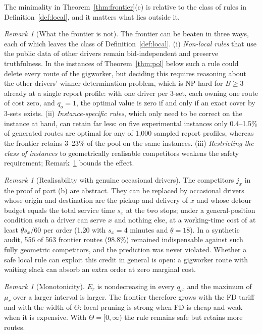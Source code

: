 \documentclass[review,12pt]{elsarticle}
\theoremstyle{definition}
\theoremstyle{remark}
\newtheorem{remark}[theorem]{Remark}
\newcommand{\lth}{\underline{\theta}}
\begin{document}
The minimality in Theorem~\ref{thm:frontier}(c) is relative to the class of
rules in Definition~\ref{def:local}, and it matters what lies outside it.

\begin{remark}[What the frontier is not]
\label{rem:scope}
The frontier can be beaten in three ways, each of which leaves the class of
Definition~\ref{def:local}. (i) \emph{Non-local rules} that use the public
data of other drivers remain bid-independent and preserve truthfulness. In
the instances of Theorem~\ref{thm:pol} below such a rule could delete every
route of the gigworker, but deciding this requires reasoning about the
other drivers' winner-determination problem, which is NP-hard for
$B\ge 3$ already at a single report profile: with one driver per 3-set,
each owning one route of cost zero, and $q_o=1$, the optimal value is zero
if and only if an exact cover by 3-sets exists. (ii) \emph{Instance-specific
rules}, which only need to be correct on the instance at hand, can retain
far less: on five experimental instances only 0.4--1.5\% of generated routes
are optimal for any of 1,000 sampled report profiles, whereas the frontier
retains 3--23\% of the pool on the same instances. (iii) \emph{Restricting
the class of instances} to geometrically realisable competitors weakens the
safety requirement; Remark~\ref{rem:realisable} bounds the effect.
\end{remark}

\begin{remark}[Realisability with genuine occasional drivers]
\label{rem:realisable}
The competitors $j_x$ in the proof of part (b) are abstract. They can be
replaced by occasional drivers whose origin and destination are the pickup
and delivery of $x$ and whose detour budget equals the total service time
$s_x$ at the two stops; under a general-position condition such a driver
can serve $x$ and nothing else, at a working-time cost of at least
$\lth s_x/60$ per order (1.20 with $s_x=4$ minutes and $\lth=18$). In a
synthetic audit, 556 of 563 frontier routes (98.8\%) remained indispensable
against such fully geometric competitors, and the prediction was never
violated. Whether a safe local rule can exploit this credit in general is
open: a gigworker route with waiting slack can absorb an extra order at
zero marginal cost.
\end{remark}

\begin{remark}[Monotonicity]
\label{rem:monotone}
$E_r$ is nondecreasing in every $q_o$, and the maximum of $\mu_r$ over a
larger interval is larger. The frontier therefore grows with the FD tariff
and with the width of $\Theta$: local pruning is strong when FD is cheap and
weak when it is expensive. With $\Theta=[0,\infty)$ the rule remains safe but
retains more routes.
\end{remark}
\end{document}
